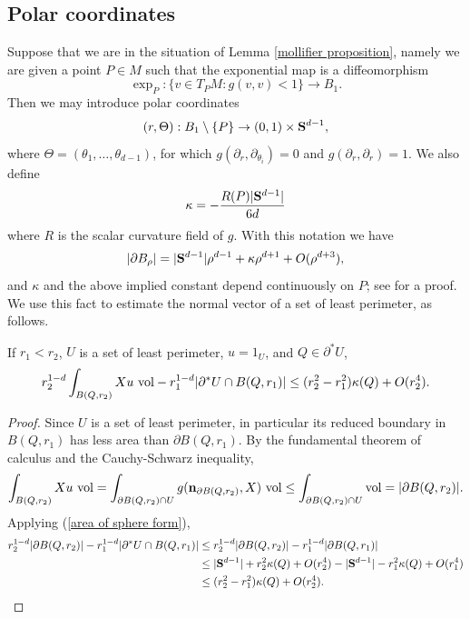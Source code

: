 
\subsection{Polar coordinates}
Suppose that we are in the situation of Lemma \ref{mollifier proposition}, namely we are given a point $P \in M$ such that the exponential map is a diffeomorphism
\begin{equation}\label{exp map mollify}
\exp_P: \{v \in T_PM: g(v, v) < 1\} \to B_1.
\end{equation}
Then we may introduce polar coordinates
\begin{equation}\label{polar coordinates mollify}
(r, \Theta): B_1 \setminus \{P\} \to (0, 1) \times \mathbf S^{d - 1},
\end{equation}
where $\Theta = (\theta_1, \dots, \theta_{d - 1})$,
for which $g(\partial_r, \partial_{\theta_i}) = 0$ and $g(\partial_r, \partial_r) = 1$.
We also define
$$\kappa = -\frac{R(P)|\mathbf S^{d - 1}|}{6d}$$
where $R$ is the scalar curvature field of $g$.
With this notation we have
\begin{equation}\label{area of sphere form}
|\partial B_\rho| = |\mathbf S^{d - 1}|\rho^{d - 1} + \kappa \rho^{d + 1} + O(\rho^{d + 3}),
\end{equation}
and $\kappa$ and the above implied constant depend continuously on $P$; see \cite{gray1974volume} for a proof.
We use this fact to estimate the normal vector of a set of least perimeter, as follows.

\begin{lemma}\label{scalar curvature monotonicity}
If $r_1 < r_2$, $U$ is a set of least perimeter, $u = 1_U$, and $Q \in \partial^* U$,
$$r_2^{1 - d}\int_{B(Q, r_2)} Xu ~\mathrm{vol} - r_1^{1 - d}|\partial^* U \cap B(Q, r_1)| \leq (r_2^2 - r_1^2)\kappa(Q) + O(r_2^4).$$
\end{lemma}
\begin{proof}
Since $U$ is a set of least perimeter, in particular its reduced boundary in $B(Q, r_1)$ has less area than $\partial B(Q, r_1)$.
By the fundamental theorem of calculus and the Cauchy-Schwarz inequality,
$$\int_{B(Q, r_2)} Xu ~\mathrm{vol} = \int_{\partial B(Q, r_2) \cap U} g(\mathbf n_{\partial B(Q, r_2)}, X) ~\mathrm{vol} \leq \int_{\partial B(Q, r_2) \cap U} \mathrm{vol} = |\partial B(Q, r_2)|.$$
Applying (\ref{area of sphere form}),
\begin{align*}
r_2^{1 - d}|\partial B(Q, r_2)| - r_1^{1 - d}|\partial^* U \cap B(Q, r_1)|
&\leq r_2^{1 - d}|\partial B(Q, r_2)| - r_1^{1 - d}|\partial B(Q, r_1)| \\
&\leq |\mathbf S^{d - 1}| + r_2^2\kappa(Q) + O(r_2^4) - |\mathbf S^{d - 1}| - r_1^2 \kappa(Q) + O(r_1^4)\\
&\leq (r_2^2 - r_1^2)\kappa(Q) + O(r_2^4).\qedhere
\end{align*}
\end{proof}

